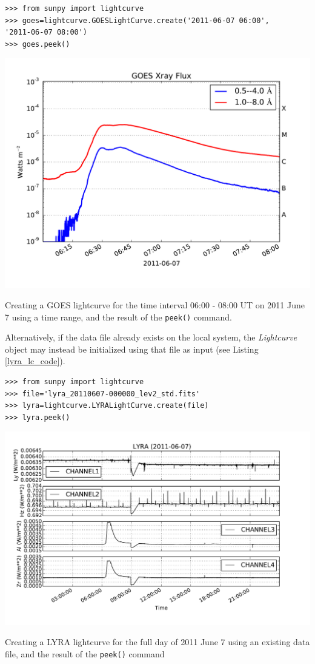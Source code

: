 \begin{listing}[h]
\begin{verbatim}
>>> from sunpy import lightcurve
>>> goes=lightcurve.GOESLightCurve.create('2011-06-07 06:00',
'2011-06-07 08:00')
>>> goes.peek()
\end{verbatim}
\includegraphics[width=14cm]{goes_lightcurve.pdf}
\label{goes_lc_code}
\caption{Creating a GOES lightcurve for the time interval 06:00 - 08:00 UT on 
2011 June 7 using a time range, and the result of the \texttt{peek()} command.}
\end{listing}

Alternatively, if the data file already exists on the local system, the 
\textit{Lightcurve} object may instead be initialized using that file as input 
(see Listing \ref{lyra_lc_code}).

\begin{listing}[h]
\begin{verbatim}
>>> from sunpy import lightcurve
>>> file='lyra_20110607-000000_lev2_std.fits'
>>> lyra=lightcurve.LYRALightCurve.create(file)
>>> lyra.peek()
\end{verbatim}
\includegraphics[width=14cm]{lyra_lightcurve.pdf}
\label{lyra_lc_code}
\caption{Creating a LYRA lightcurve for the full day of 2011 June 7 using an 
existing data file, and the result of the \texttt{peek()} command}
\end{listing}


